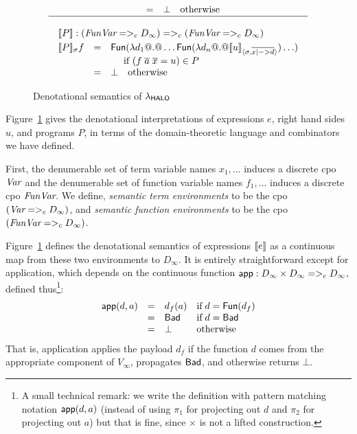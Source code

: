 \begin{figure}
$$\begin{array}{c}
\begin{array}{rcl}
          & = & \bot \quad \text{otherwise}
\end{array} \\
\hline \\
\begin{array}{rcl}
\multicolumn{3}{l}{\dbrace{P} : (\FVarCpo =>_c D_{\infty}) =>_c (\FVarCpo =>_c D_{\infty})}  \\[1mm]
\dbrace{P}_{\sigma} f & = & \roll{\ret{\injFun{\dlambda d_1 @.@ \ldots
       \roll{\ret{\injFun{\dlambda d_n @.@ \interp{u}{\sigma}{\ol{x |-> d}}}}}\ldots}}} \\
 && \quad \text{ if } (f\;\ol{a}\;\ol{x} = u) \in P \\
          & = & \bot \quad \text{otherwise}
\end{array}
\end{array}
$$
\caption{Denotational semantics of $\lambda_{\sf HALO}$} \label{f:denot}
\end{figure}

Figure~\ref{f:denot} gives the denotational interpretations
of expressions $e$, right hand sides $u$, and programs $P$, in
terms of the domain-theoretic language and combinators we have defined.

First, the denumerable set of term variable names $x_1,\ldots$ induces a discrete
cpo $\textit{Var}$  and the denumerable set of function variable names $f_1,\ldots$ induces a discrete
cpo $\textit{FunVar}$. We define, {\em semantic term environments} to be the cpo $(\textit{Var} =>_c D_{\infty})$,
and {\em semantic function environments} to be the cpo $(\textit{FunVar} =>_c D_{\infty})$.

Figure~\ref{f:denot} defines the denotational semantics of expressions
$[\![e]\!]$ as a continuous map from these two environments to $D_{\infty}$.
It is entirely straightforward except for application, which depends on
the continuous function $\mathsf{app} : D_\infty \times D_\infty =>_c D_\infty$,
defined thus\footnote{
A small technical remark: we write
the definition with pattern matching notation
$\mathsf{app}(d,a)$ (instead of using $\pi_1$ for projecting
out $d$ and $\pi_2$ for projecting out $a$) but that is fine,
since $\times$ is not a lifted construction.
}:
{\setlength{\arraycolsep}{2pt}
\[\begin{array}{rcll}
  \mathsf{app}(d,a) & = & d_f(a)    & \mbox{if}\; d = \mathsf{Fun}(d_f) \\
             & = & \mathsf{Bad} & \mbox{if}\; d = \mathsf{Bad} \\
             & = & \bot    & \mbox{otherwise}
\end{array}\]}%
That is, application applies the payload $d_f$
if the function $d$ comes
from the appropriate component of $V_{\infty}$, propagates $\mathsf{Bad}$,
and otherwise returns $\bot$.  %


